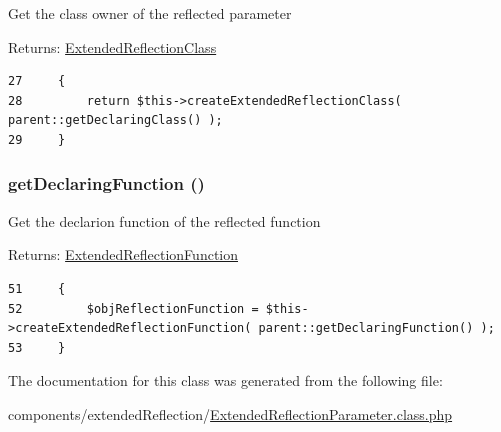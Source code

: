 Get the class owner of the reflected parameter

\begin{Desc}
\item[Returns:]\hyperlink{class_extended_reflection_class}{ExtendedReflectionClass} \end{Desc}


\begin{Code}\begin{verbatim}27     {
28         return $this->createExtendedReflectionClass( parent::getDeclaringClass() );
29     }
\end{verbatim}
\end{Code}


\hypertarget{class_extended_reflection_parameter_af67f978eb2fb55cd1835c75ab86feba}{
\subsubsection[{getDeclaringFunction}]{\setlength{\rightskip}{0pt plus 5cm}getDeclaringFunction ()}}
\label{class_extended_reflection_parameter_af67f978eb2fb55cd1835c75ab86feba}


Get the declarion function of the reflected function

\begin{Desc}
\item[Returns:]\hyperlink{class_extended_reflection_function}{ExtendedReflectionFunction} \end{Desc}


\begin{Code}\begin{verbatim}51     {
52         $objReflectionFunction = $this->createExtendedReflectionFunction( parent::getDeclaringFunction() );
53     }
\end{verbatim}
\end{Code}




The documentation for this class was generated from the following file:\begin{CompactItemize}
\item 
components/extendedReflection/\hyperlink{_extended_reflection_parameter_8class_8php}{ExtendedReflectionParameter.class.php}\end{CompactItemize}

